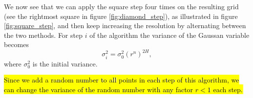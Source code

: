 \begin{enumerate}
\end{enumerate}

We now see that we can apply the square step four times on the resulting grid (see the rightmost square in figure \ref{fig:diamond_step}), as illustrated in figure \ref{fig:square_step}, and then keep increasing the resolution by alternating between the two methods. For step $i$ of the algorithm the variance of the Gaussan variable becomes
\begin{equation}
    \sigma_i^2 = \sigma_0^2\left(r^n\right)^{2H},
\end{equation}
where $\sigma_0^2$ is the initial variance.

\hl{Since we add a random number to all points in each step of this algorithm, we can change the variance of the random number with any factor $r<1$ each step.}

% 
% 

